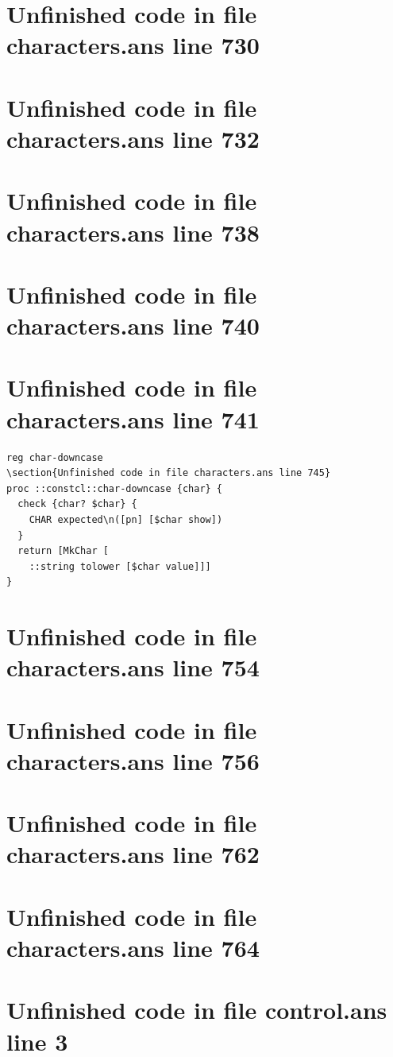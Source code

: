 \documentclass[twoside,9pt]{report}
\begin{document}
\section{Unfinished code in file characters.ans line 730}
\section{Unfinished code in file characters.ans line 732}
\section{Unfinished code in file characters.ans line 738}
\section{Unfinished code in file characters.ans line 740}
\section{Unfinished code in file characters.ans line 741}
\begin{lstlisting}
reg char-downcase
\section{Unfinished code in file characters.ans line 745}
proc ::constcl::char-downcase {char} {
  check {char? $char} {
    CHAR expected\n([pn] [$char show])
  }
  return [MkChar [
    ::string tolower [$char value]]]
}
\end{lstlisting}
\section{Unfinished code in file characters.ans line 754}
\section{Unfinished code in file characters.ans line 756}
\section{Unfinished code in file characters.ans line 762}
\section{Unfinished code in file characters.ans line 764}
\section{Unfinished code in file control.ans line 3}
\end{document}
